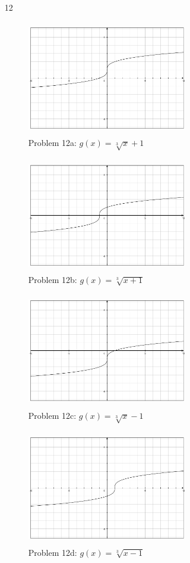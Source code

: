 \documentclass[fleqn,addpoints]{exam}
\begin{document}
\begin{itemize}
\item[12]

\begin{figure}[H]
  \centering
  \includegraphics[width=7cm,height=5cm]{1.9-12a.eps}
  \caption*{Problem 12a: $g(x) = \sqrt[3]{x} + 1$}
\end{figure}

\begin{figure}[H]
  \centering
  \includegraphics[width=7cm,height=5cm]{1.9-12b.eps}
  \caption*{Problem 12b: $g(x) = \sqrt[3]{x + 1}$}
\end{figure}

\begin{figure}[H]
  \centering
  \includegraphics[width=7cm,height=5cm]{1.9-12c.eps}
  \caption*{Problem 12c: $g(x) = \sqrt[3]{x} - 1$}
\end{figure}

\begin{figure}[H]
  \centering
  \includegraphics[width=7cm,height=5cm]{1.9-12d.eps}
  \caption*{Problem 12d: $g(x) = \sqrt[3]{x - 1}$}
\end{figure}


\end{itemize}
\end{document}
